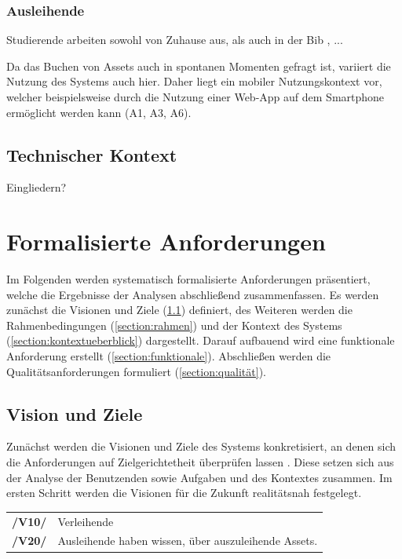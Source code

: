 \subsubsection{Ausleihende}
Studierende arbeiten sowohl von Zuhause aus, als auch in der Bib , ... 

Da das Buchen von Assets auch in spontanen Momenten gefragt ist, variiert die Nutzung des Systems
auch hier. Daher liegt ein mobiler Nutzungskontext vor, welcher beispielsweise durch die Nutzung
einer Web-App auf dem Smartphone ermöglicht werden kann (A1, A3, A6).

\subsection{Technischer Kontext}
Eingliedern?


\section{Formalisierte Anforderungen}
\label{section:anforderung}

Im Folgenden werden systematisch formalisierte Anforderungen präsentiert, welche die Ergebnisse der
Analysen abschließend zusammenfassen. Es werden zunächst die Visionen und Ziele
(\ref{section:visionziel}) definiert, des Weiteren werden die Rahmenbedingungen
(\ref{section:rahmen}) und der Kontext des Systems (\ref{section:kontextueberblick}) dargestellt.
Darauf aufbauend wird eine funktionale Anforderung erstellt (\ref{section:funktionale}). Abschließen
werden die Qualitätsanforderungen formuliert (\ref{section:qualität}).


\subsection{Vision und Ziele}
\label{section:visionziel}
Zunächst werden die Visionen und Ziele des Systems konkretisiert, an denen sich die Anforderungen
auf Zielgerichtetheit überprüfen lassen \cite{balzert2009}. Diese setzen sich aus der Analyse der
Benutzenden sowie Aufgaben und des Kontextes zusammen. Im ersten Schritt werden die Visionen für die
Zukunft realitätsnah festgelegt.



\begin{center}
        \renewcommand{\arraystretch}{1.5}
        \begin{tabular}{p{}p{}}
                \hline
                \textbf{/V10/} & Verleihende \\
                \textbf{/V20/} & Ausleihende haben wissen, über auszuleihende Assets. \\
                \hline
        \end{tabular}
\end{center}


